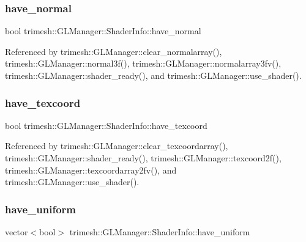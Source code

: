 \subsubsection{\texorpdfstring{have\+\_\+normal}{have\_normal}}
{\footnotesize\ttfamily bool trimesh\+::\+G\+L\+Manager\+::\+Shader\+Info\+::have\+\_\+normal}



Referenced by trimesh\+::\+G\+L\+Manager\+::clear\+\_\+normalarray(), trimesh\+::\+G\+L\+Manager\+::normal3f(), trimesh\+::\+G\+L\+Manager\+::normalarray3fv(), trimesh\+::\+G\+L\+Manager\+::shader\+\_\+ready(), and trimesh\+::\+G\+L\+Manager\+::use\+\_\+shader().

\mbox{\label{classtrimesh_1_1GLManager_1_1ShaderInfo_a17bc641438ea6274f09f431a3c1e9043}} 
\subsubsection{\texorpdfstring{have\+\_\+texcoord}{have\_texcoord}}
{\footnotesize\ttfamily bool trimesh\+::\+G\+L\+Manager\+::\+Shader\+Info\+::have\+\_\+texcoord}



Referenced by trimesh\+::\+G\+L\+Manager\+::clear\+\_\+texcoordarray(), trimesh\+::\+G\+L\+Manager\+::shader\+\_\+ready(), trimesh\+::\+G\+L\+Manager\+::texcoord2f(), trimesh\+::\+G\+L\+Manager\+::texcoordarray2fv(), and trimesh\+::\+G\+L\+Manager\+::use\+\_\+shader().

\mbox{\label{classtrimesh_1_1GLManager_1_1ShaderInfo_af49ea2f4c844c265563a042cef631e6a}} 
\subsubsection{\texorpdfstring{have\+\_\+uniform}{have\_uniform}}
{\footnotesize\ttfamily vector$<$bool$>$ trimesh\+::\+G\+L\+Manager\+::\+Shader\+Info\+::have\+\_\+uniform}



